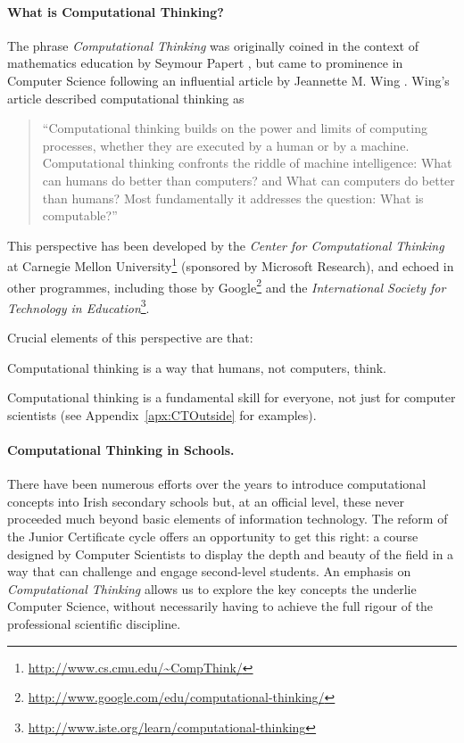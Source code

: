 \documentclass[a4paper]{article}
\begin{document}
\paragraph{What is Computational Thinking?}

The phrase \textit{Computational Thinking} was originally coined in the context of mathematics education by Seymour Papert \cite{papert96}, but came to prominence in Computer Science following an influential article by Jeannette M. Wing \cite{wing-cacm06}.  Wing's article described computational thinking as
\begin{quotation}
``Computational thinking builds on the power and limits of computing processes, whether they are executed by a human or by a machine.  Computational thinking confronts the riddle of machine intelligence: What can humans do better than computers? and What can computers do better than humans? Most fundamentally it addresses the question: What is computable?''
\end{quotation}


This perspective has been developed by the 
\textit{Center for Computational Thinking} at Carnegie Mellon University\footnote{\url{http://www.cs.cmu.edu/~CompThink/}}
(sponsored by Microsoft Research), and echoed in other programmes, including those by 
Google\footnote{\url{http://www.google.com/edu/computational-thinking/}} and the
\textit{International Society for Technology in Education}\footnote{\url{http://www.iste.org/learn/computational-thinking}}.

Crucial elements of this perspective are that:
\begin{compactitem}
\item Computational thinking is a way that humans, not computers, think.
\item Computational thinking is a fundamental skill for everyone, not just for computer scientists (see Appendix~\ref{apx:CTOutside} for examples).
\end{compactitem}


\paragraph{Computational Thinking in Schools.} \label{par:CTSchools}

There have been numerous efforts over the years to introduce computational concepts into Irish secondary schools but, at an official level, these never proceeded much beyond basic elements of information technology.  The reform of the Junior Certificate cycle offers an opportunity to get this right: a course designed by Computer Scientists to display the depth and beauty of the field in a way that can challenge and engage second-level students.  An emphasis on 
\textit{Computational Thinking} allows us to explore the key concepts the underlie Computer Science, without necessarily having to achieve the full rigour of the professional scientific discipline.
\end{document}
